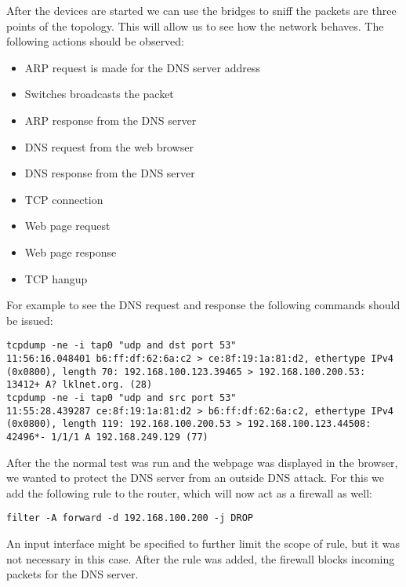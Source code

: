 After the devices are started we can use the bridges to sniff the packets are three points of the topology.
This will allow us to see how the network behaves. The following actions should be observed:
\begin{itemize}
	\item ARP request is made for the DNS server address
	\item Switches broadcasts the packet
	\item ARP response from the DNS server
	\item DNS request from the web browser
	\item DNS response from the DNS server
	\item TCP connection
	\item Web page request
	\item Web page response
	\item TCP hangup
\end{itemize}

For example to see the DNS request and response the following commands should be issued:
\lstset{language=zsh, caption=DNS request and respons, label=lst:dnsrr}
\begin{lstlisting}
tcpdump -ne -i tap0 "udp and dst port 53"
11:56:16.048401 b6:ff:df:62:6a:c2 > ce:8f:19:1a:81:d2, ethertype IPv4 (0x0800), length 70: 192.168.100.123.39465 > 192.168.100.200.53: 13412+ A? lklnet.org. (28)
tcpdump -ne -i tap0 "udp and src port 53"
11:55:28.439287 ce:8f:19:1a:81:d2 > b6:ff:df:62:6a:c2, ethertype IPv4 (0x0800), length 119: 192.168.100.200.53 > 192.168.100.123.44508: 42496*- 1/1/1 A 192.168.249.129 (77)
\end{lstlisting}


After the the normal test was run and the webpage was displayed in the browser, we wanted to protect the DNS server from 
an outside DNS attack. For this we add the following rule to the router, which will now act as a firewall as well:
\lstset{language=zsh, caption=, label=complex-firewall}
\begin{lstlisting}
filter -A forward -d 192.168.100.200 -j DROP
\end{lstlisting}
An input interface might be specified to further limit the scope of rule, but it was not necessary in this case.
After the rule was added, the firewall blocks incoming packets for the DNS server.

